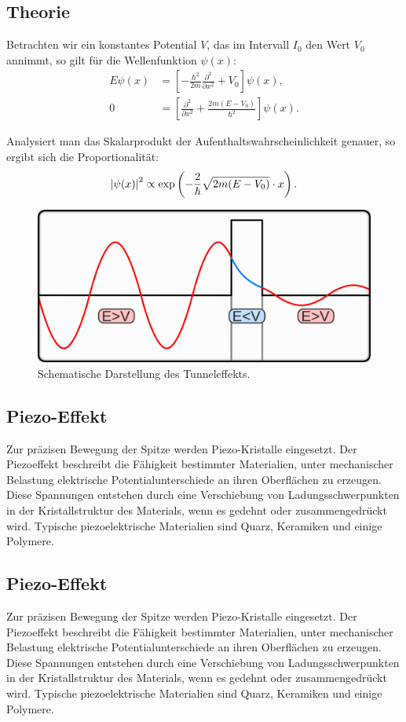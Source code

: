 \documentclass{article}
\begin{document}
\subsection*{Theorie}
Betrachten wir ein konstantes Potential \( V \), das im Intervall \( I_0 \) den Wert \( V_0 \) annimmt, so gilt für die Wellenfunktion \( \psi(x) \): 
\begin{align*}
    E \psi(x) &= \left[ - \frac{\hbar^2}{2m} \frac{\partial^2}{\partial x^2} + V_0 \right] \psi(x), \\
    0 &= \left[ \frac{\partial^2}{\partial x^2} + \frac{2m(E - V_0)}{\hbar^2} \right] \psi(x).
\end{align*}

Analysiert man das Skalarprodukt der Aufenthaltswahrscheinlichkeit genauer, so ergibt sich die Proportionalität:
\begin{align*}
    \abs{\psi(x)}^2 \propto \exp\left(-\frac{2}{\hbar} \sqrt{2m (E - V_0)} \cdot x\right).
\end{align*}

\begin{figure}[h!]
    \centering
    \includegraphics[width=0.5\linewidth]{figure/tunneleffekt.png}
    \caption{Schematische Darstellung des Tunneleffekts.}
    \label{fig:tunneleffekt}
\end{figure}

\subsection*{Piezo-Effekt}
Zur präzisen Bewegung der Spitze werden Piezo-Kristalle eingesetzt. 
Der Piezoeffekt beschreibt die Fähigkeit bestimmter Materialien, unter mechanischer Belastung elektrische Potentialunterschiede an ihren Oberflächen zu erzeugen.
Diese Spannungen entstehen durch eine Verschiebung von Ladungsschwerpunkten in der Kristallstruktur des Materials, wenn es gedehnt oder zusammengedrückt wird.
Typische piezoelektrische Materialien sind Quarz, Keramiken und einige Polymere.
\subsection*{Piezo-Effekt}
Zur präzisen Bewegung der Spitze werden Piezo-Kristalle eingesetzt. 
Der Piezoeffekt beschreibt die Fähigkeit bestimmter Materialien, unter mechanischer Belastung elektrische Potentialunterschiede an ihren Oberflächen zu erzeugen.
Diese Spannungen entstehen durch eine Verschiebung von Ladungsschwerpunkten in der Kristallstruktur des Materials, wenn es gedehnt oder zusammengedrückt wird.
Typische piezoelektrische Materialien sind Quarz, Keramiken und einige Polymere.
\end{document}
